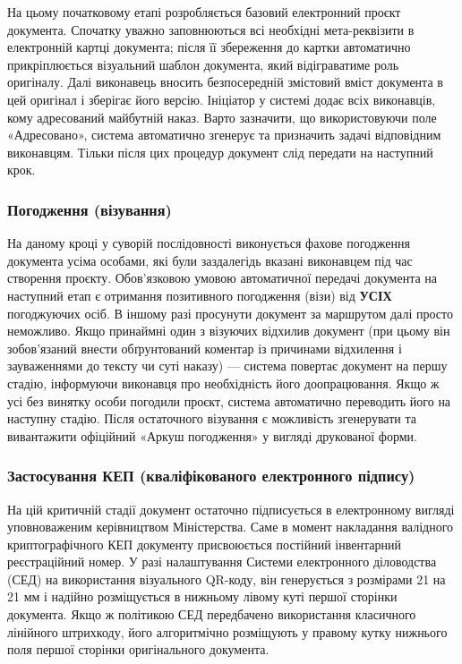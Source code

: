 На цьому початковому етапі розробляється базовий електронний проєкт документа. Спочатку уважно заповнюються всі необхідні мета-реквізити в електронній картці документа; після її збереження до картки автоматично прикріплюється візуальний шаблон документа, який відіграватиме роль оригіналу. Далі виконавець вносить безпосередній змістовий вміст документа в цей оригінал і зберігає його версію. Ініціатор у системі додає всіх виконавців, кому адресований майбутній наказ. Варто зазначити, що використовуючи поле «Адресовано», система автоматично згенерує та призначить задачі відповідним виконавцям. Тільки після цих процедур документ слід передати на наступний крок.

\subsubsection*{Погодження (візування)}

На даному кроці у суворій послідовності виконується фахове погодження документа усіма особами, які були заздалегідь вказані виконавцем під час створення проєкту. Обов'язковою умовою автоматичної передачі документа на наступний етап є отримання позитивного погодження (візи) від \textbf{УСІХ} погоджуючих осіб. В іншому разі просунути документ за маршрутом далі просто неможливо. Якщо принаймні один з візуючих відхилив документ (при цьому він зобов'язаний внести обґрунтований коментар із причинами відхилення і зауваженнями до тексту чи суті наказу) — система повертає документ на першу стадію, інформуючи виконавця про необхідність його доопрацювання. Якщо ж усі без винятку особи погодили проєкт, система автоматично переводить його на наступну стадію. Після остаточного візування є можливість згенерувати та вивантажити офіційний «Аркуш погодження» у вигляді друкованої форми.

\subsubsection*{Застосування КЕП (кваліфікованого електронного підпису)}

На цій критичній стадії документ остаточно підписується в електронному вигляді уповноваженим керівництвом Міністерства. Саме в момент накладання валідного криптографічного КЕП документу присвоюється постійний інвентарний реєстраційний номер. У разі налаштування Системи електронного діловодства (СЕД) на використання візуального QR-коду, він генерується з розмірами 21 на 21 мм і надійно розміщується в нижньому лівому куті першої сторінки документа. Якщо ж політикою СЕД передбачено використання класичного лінійного штрихкоду, його алгоритмічно розміщують у правому кутку нижнього поля першої сторінки оригінального документа.

